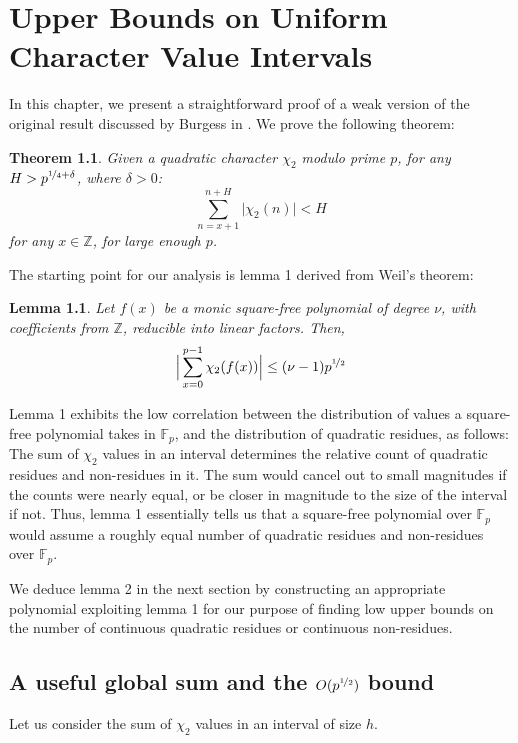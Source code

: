 \documentclass{report}
\newtheorem{lemma}{Lemma}
\newtheorem{theorem}{Theorem}
\begin{document}
\chapter{Upper Bounds on Uniform Character Value Intervals}
In this chapter, we present a straightforward proof of a weak version of the original result discussed by Burgess in \cite{burgess}. We prove the following theorem:
\begin{theorem} \label{thm:p4bound}
Given a quadratic character $\chi_2$ modulo prime $p$, for any $H>p^{\nicefrac{1}{4}+\delta}$, where $\delta>0$:
\[\sum\limits_{n=x+1}^{n+H}\lvert\chi_2(n)\rvert<H\]
for any $x\in\mathbb{Z}$, for large enough $p$.
\end{theorem}
The starting point for our analysis is lemma 1 derived from Weil's theorem:
%
\begin{lemma}
\textup{\cite{burgess}}Let $f(x)$ be a monic square-free polynomial of degree $\nu$, with coefficients from $\mathbb{Z}$, reducible into linear factors. Then,
$$\Big\lvert\sum\limits_{x=0}^{p-1}\chi_2(f(x))\Big\rvert\leq (\nu -1)p^{\nicefrac{1}{2}}$$
\end{lemma}
%
Lemma 1 exhibits the low correlation between the distribution of values a square-free polynomial takes in $\mathbb{F}_p$, and the distribution of quadratic residues, as follows: The sum of $\chi_2$ values in an interval determines the relative count of quadratic residues and non-residues in it. The sum would cancel out to small magnitudes if the counts were nearly equal, or be closer in magnitude to the size of the interval if not. Thus, lemma 1 essentially tells us that a square-free polynomial over $\mathbb{F}_p$ would assume a roughly equal number of quadratic residues and non-residues over $\mathbb{F}_p$.

We deduce lemma 2 in the next section by constructing an appropriate polynomial exploiting lemma 1 for our purpose of finding low upper bounds on the number of continuous quadratic residues or continuous non-residues.
%
%
\section{A useful global sum and the $O(p^{\nicefrac{1}{2}})$ bound}
Let us consider the sum of $\chi_2$ values in an interval of size $h$.
\end{document}
